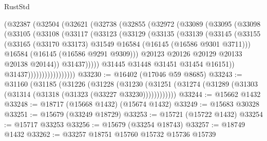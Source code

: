 \begin{lexlean}{RustStd}
\begin{coremodule}
                      (@32387
                        (@32504
                          (@32621
                            (@32738
                              (@32855
                                (@32972
                                  (@33089
                                    (@33095
                                      (@33098
                                        (@33105
                                          (@33108
                                            (@33117
                                              (@33123
                                                (@33129
                                                  (@33135
                                                    (@33139
                                                      (@33145
                                                        (@33155
                                                          (@33165
                                                            (@33170 @33173)
                                                            @31549
                                                            @16584
                                                            (@16145 (@16586 @9301 @3711)))
                                                          @16584
                                                          (@16145 (@16586 @9291 @9309)))
                                                        @20123
                                                        @20126
                                                        @20129
                                                        @20133
                                                        @20138
                                                        @20144))
                                                    @31437)))))
                                          @31445
                                          @31448
                                          @31451
                                          @31454
                                          @16151))
                                      @31437)))))))))))))))))
@33230 := @16402 (@17046 @59 @8685)
@33243 := @31160
    (@31185
      (@31226
        (@31228
          (@31230 (@31251 (@31274 (@31289 (@31303 (@31314 (@31318 (@31323 (@33227 @33230))))))))))))
@33244 := @15662 @1432
@33248 := @18717 (@15668 @1432) (@15674 @1432)
@33249 := @15683 @30328
@33251 := @15679 (@33249 @18729)
@33253 := @15721 (@15722 @1432)
@33254 := @15717 @33253
@33256 := @15679 (@33254 @18743)
@33257 := @18749 @1432
@33262 := @33257 @18751 @15760 @15732 @15736 @15739

\end{coremodule}
\end{lexlean}
